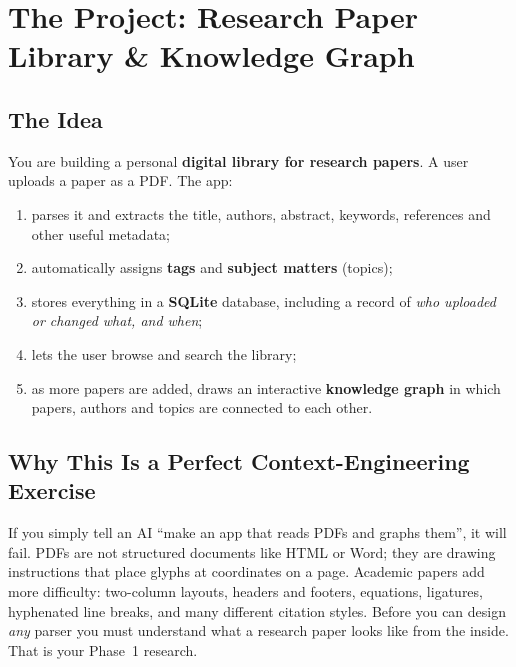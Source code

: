 \documentclass[11pt,a4paper]{article}
\begin{document}
\section{The Project: Research Paper Library \& Knowledge Graph}
\subsection{The Idea}
You are building a personal \textbf{digital library for research papers}. A user uploads a paper as a PDF. The app:
\begin{enumerate}
\item parses it and extracts the title, authors, abstract, keywords, references and other useful metadata;
\item automatically assigns \textbf{tags} and \textbf{subject matters} (topics);
\item stores everything in a \textbf{SQLite} database, including a record of \emph{who uploaded or changed what, and when};
\item lets the user browse and search the library;
\item as more papers are added, draws an interactive \textbf{knowledge graph} in which papers, authors and topics are connected to each other.
\end{enumerate}

\subsection{Why This Is a Perfect Context-Engineering Exercise}
If you simply tell an AI ``make an app that reads PDFs and graphs them'', it will fail. PDFs are not structured documents like HTML or Word; they are drawing instructions that place glyphs at coordinates on a page. Academic papers add more difficulty: two-column layouts, headers and footers, equations, ligatures, hyphenated line breaks, and many different citation styles. Before you can design \emph{any} parser you must understand what a research paper looks like from the inside. That is your Phase~1 research.
\end{document}
